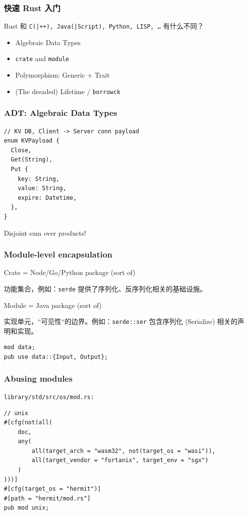 \documentclass[UTF-8]{ctexbeamer}
\begin{document}
\begin{frame}
  \frametitle{快速 Rust 入门}

  Rust 和 \texttt{C(|++), Java(|Script), Python, LISP, \dots} 有什么不同？

  \pause
  \vspace{1em}

  \begin{itemize}
    \item Algebraic Data Types
    \item \texttt{crate} and \texttt{module}
    \item Polymorphism: Generic + Trait
    \item (The dreaded) Lifetime / \texttt{borrowck}
  \end{itemize}
\end{frame}

\begin{frame}[fragile]
  \frametitle{ADT: Algebraic Data Types}

  \begin{verbatim}
// KV DB, Client -> Server conn payload
enum KVPayload {
  Close,
  Get(String),
  Put {
    key: String,
    value: String,
    expire: Datetime,
  },
}
  \end{verbatim}

  \pause
  \vspace{1em}
  Disjoint sum over products!
\end{frame}

\begin{frame}[fragile]
  \frametitle{Module-level encapsulation}

  Crate = Node/Go/Python package (sort of)

  功能集合，例如：\texttt{serde} 提供了序列化、反序列化相关的基础设施。

  \pause
  \vspace{1em}

  Module = Java package (sort of)

  实现单元，“可见性“的边界。例如：\texttt{serde::ser} 包含序列化 (Serialize) 相关的声明和实现。

  \pause
  \vspace{1em}

  \begin{verbatim}
mod data;
pub use data::{Input, Output};
  \end{verbatim}
\end{frame}

\begin{frame}[fragile]
  \frametitle{Abusing modules}

  \texttt{library/std/src/os/mod.rs:}

  \begin{verbatim}
// unix
#[cfg(not(all(
    doc,
    any(
        all(target_arch = "wasm32", not(target_os = "wasi")),
        all(target_vendor = "fortanix", target_env = "sgx")
    )
)))]
#[cfg(target_os = "hermit")]
#[path = "hermit/mod.rs"]
pub mod unix;
  \end{verbatim}
\end{frame}
\end{document}
